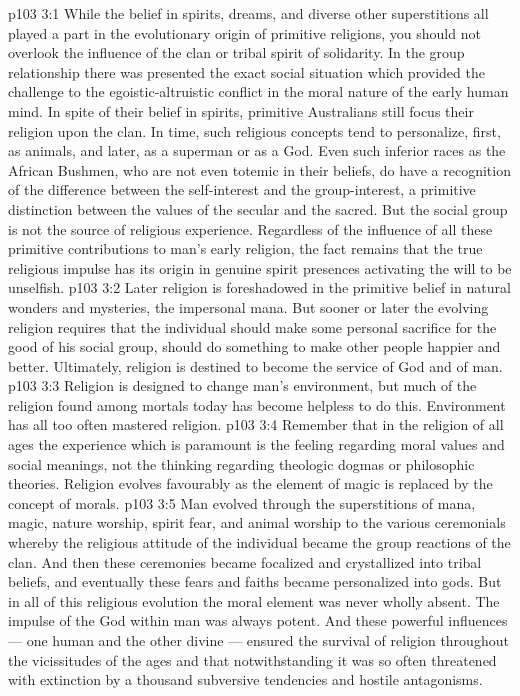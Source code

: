 \vs p103 3:1 While the belief in spirits, dreams, and diverse other superstitions all played a part in the evolutionary origin of primitive religions, you should not overlook the influence of the clan or tribal spirit of solidarity. In the group relationship there was presented the exact social situation which provided the challenge to the egoistic\hyp{}altruistic conflict in the moral nature of the early human mind. In spite of their belief in spirits, primitive Australians still focus their religion upon the clan. In time, such religious concepts tend to personalize, first, as animals, and later, as a superman or as a God. Even such inferior races as the African Bushmen, who are not even totemic in their beliefs, do have a recognition of the difference between the self\hyp{}interest and the group\hyp{}interest, a primitive distinction between the values of the secular and the sacred. But the social group is not the source of religious experience. Regardless of the influence of all these primitive contributions to man’s early religion, the fact remains that the true religious impulse has its origin in genuine spirit presences activating the will to be unselfish.
\vs p103 3:2 \pc Later religion is foreshadowed in the primitive belief in natural wonders and mysteries, the impersonal mana. But sooner or later the evolving religion requires that the individual should make some personal sacrifice for the good of his social group, should do something to make other people happier and better. Ultimately, religion is destined to become the service of God and of man.
\vs p103 3:3 Religion is designed to change man’s environment, but much of the religion found among mortals today has become helpless to do this. Environment has all too often mastered religion.
\vs p103 3:4 \pc Remember that in the religion of all ages the experience which is paramount is the feeling regarding moral values and social meanings, not the thinking regarding theologic dogmas or philosophic theories. Religion evolves favourably as the element of magic is replaced by the concept of morals.
\vs p103 3:5 Man evolved through the superstitions of mana, magic, nature worship, spirit fear, and animal worship to the various ceremonials whereby the religious attitude of the individual became the group reactions of the clan. And then these ceremonies became focalized and crystallized into tribal beliefs, and eventually these fears and faiths became personalized into gods. But in all of this religious evolution the moral element was never wholly absent. The impulse of the God within man was always potent. And these powerful influences --- one human and the other divine --- ensured the survival of religion throughout the vicissitudes of the ages and that notwithstanding it was so often threatened with extinction by a thousand subversive tendencies and hostile antagonisms.
